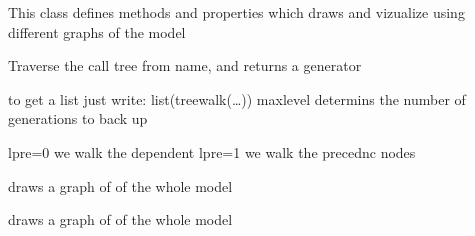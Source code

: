 \documentclass[letterpaper,10pt,english]{sphinxmanual}
\begin{document}
\begin{fulllineitems}
\label{\detokenize{index:modelclass.Graph_Draw_Mixin}}
\pysigstartsignatures
{}
\pysigstopsignatures
\sphinxAtStartPar
This class defines methods and properties which draws and vizualize using different
graphs of the model

\begin{fulllineitems}
\label{\detokenize{index:modelclass.Graph_Draw_Mixin.treewalk}}
\pysigstartsignatures
{}
\pysigstopsignatures
\sphinxAtStartPar
Traverse the call tree from name, and returns a generator

\sphinxAtStartPar
to get a list just write: list(treewalk(…))
maxlevel determins the number of generations to back up

\sphinxAtStartPar
lpre=0 we walk the dependent
lpre=1 we walk the precednc nodes

\end{fulllineitems}


\begin{fulllineitems}
\label{\detokenize{index:modelclass.Graph_Draw_Mixin.drawendo}}
\pysigstartsignatures
{}
\pysigstopsignatures
\sphinxAtStartPar
draws a graph of of the whole model

\end{fulllineitems}


\begin{fulllineitems}
\label{\detokenize{index:modelclass.Graph_Draw_Mixin.drawendo_lag_lead}}
\pysigstartsignatures
{}
\pysigstopsignatures
\sphinxAtStartPar
draws a graph of of the whole model


\end{fulllineitems}
\end{fulllineitems}
\end{document}
